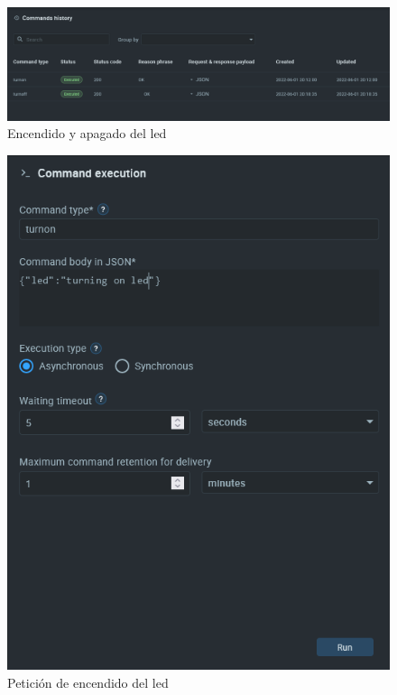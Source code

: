 {\begin{figure}[p]
    \centering
    \includegraphics[width=\linewidth]{imagenes/command-execution.png}
    \caption{Encendido y apagado del led}
    \label{fig:figure14}
\end{figure}

\begin{figure}[p]
    \centering
    \includegraphics[width=\linewidth]{imagenes/turn-on-led.png}
    \caption{Petición de encendido del led}
    \label{fig:figure15}
\end{figure}

}
